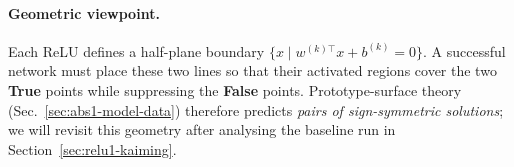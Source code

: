 \paragraph{Geometric viewpoint.}
Each ReLU defines a half-plane boundary \(\{x\mid w^{(k)\!\top}x+b^{(k)}=0\}\). A successful network must place these two lines so that their activated regions cover the two \textbf{True} points while suppressing the \textbf{False} points. Prototype-surface theory (Sec.~\ref{sec:abs1-model-data}) therefore predicts \emph{pairs of sign-symmetric solutions}; we will revisit this geometry after analysing the baseline run in Section~\ref{sec:relu1-kaiming}.
